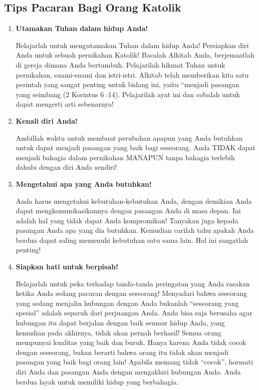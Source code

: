 \documentclass[a4paper,11pt,openany]{article}
\begin{document}
\subsection*{Tips Pacaran Bagi Orang Katolik}
\begin{enumerate}
\item \textbf{Utamakan Tuhan dalam hidup Anda!}

Belajarlah untuk mengutamakan Tuhan dalam hidup Anda! Persiapkan diri Anda untuk sebuah pernikahan Katolik! Bacalah Alkitab Anda, berjemaatlah di gereja dimana Anda bertumbuh. Pelajarilah hikmat Tuhan untuk pernikahan, suami-suami dan istri-istri. Alkitab telah memberikan kita satu perintah yang sangat penting untuk bidang ini, yaitu ``menjadi pasangan yang seimbang (2 Korintus 6 :14). Pelajarilah ayat ini dan cobalah untuk dapat mengerti arti sebenarnya!

\item  \textbf{Kenali diri Anda!} 

Ambillah waktu untuk membuat perubahan apapun yang Anda butuhkan untuk dapat menjadi pasangan yang baik bagi seseorang. Anda TIDAK dapat menjadi bahagia dalam pernikahan MANAPUN tanpa bahagia terlebih dahulu dengan diri Anda sendiri!

\item  \textbf{Mengetahui apa yang Anda butuhkan!} 

Anda harus mengetahui kebutuhan-kebutuhan Anda, dengan demikian Anda dapat mengkomunikasikannya dengan pasangan Anda di masa depan. Ini adalah hal
yang tidak dapat Anda kompromikan! Tanyakan juga kepada pasangan Anda apa yang dia butuhkan. Kemudian carilah tahu apakah Anda berdua dapat saling memenuhi kebutuhan satu sama lain. Hal ini sangatlah penting!

\item  \textbf{Siapkan hati untuk berpisah!}

Belajarlah untuk peka terhadap tanda-tanda peringatan yang Anda rasakan ketika Anda sedang pacaran dengan seseorang! Menyadari bahwa seseorang yang sedang menjalin hubungan dengan Anda bukanlah ``seseorang yang spesial'' adalah separuh dari perjuangan Anda. Anda bisa saja berusaha agar hubungan itu dapat berjalan dengan baik seumur hidup Anda, yang kemudian pada akhirnya, tidak akan pernah berhasil! Semua orang mempunyai kualitas yang baik dan buruk. Hanya karena Anda tidak cocok
dengan seseorang, bukan berarti bahwa orang itu tidak akan menjadi pasangan yang baik bagi orang lain! Apabila memang tidak ``cocok'', hormati diri Anda dan pasangan Anda dengan mengakhiri hubungan Anda. Anda berdua layak untuk memiliki hidup yang berbahagia.


\end{enumerate}
\end{document}

